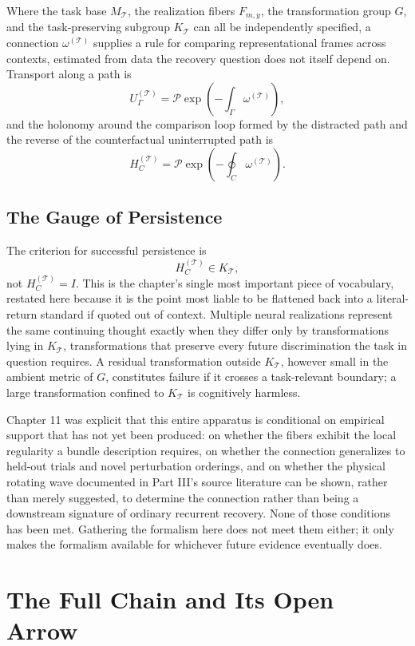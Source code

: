 \documentclass[11pt]{book}
\begin{document}
Where the task base $M_{\mathcal T}$, the realization fibers $F_{m,y}$, the transformation group $G$, and the task-preserving subgroup $K_{\mathcal T}$ can all be independently specified, a connection $\omega^{(\mathcal T)}$ supplies a rule for comparing representational frames across contexts, estimated from data the recovery question does not itself depend on. Transport along a path is
\[
U_\Gamma^{(\mathcal T)}=\mathcal P\exp\left(-\int_\Gamma\omega^{(\mathcal T)}\right),
\]
and the holonomy around the comparison loop formed by the distracted path and the reverse of the counterfactual uninterrupted path is
\[
H_C^{(\mathcal T)}=\mathcal P\exp\left(-\oint_C\omega^{(\mathcal T)}\right).
\]

\section*{The Gauge of Persistence}

The criterion for successful persistence is
\[
H_C^{(\mathcal T)}\in K_{\mathcal T},
\]
not $H_C^{(\mathcal T)}=I$. This is the chapter's single most important piece of vocabulary, restated here because it is the point most liable to be flattened back into a literal-return standard if quoted out of context. Multiple neural realizations represent the same continuing thought exactly when they differ only by transformations lying in $K_{\mathcal T}$, transformations that preserve every future discrimination the task in question requires. A residual transformation outside $K_{\mathcal T}$, however small in the ambient metric of $G$, constitutes failure if it crosses a task-relevant boundary; a large transformation confined to $K_{\mathcal T}$ is cognitively harmless.

Chapter 11 was explicit that this entire apparatus is conditional on empirical support that has not yet been produced: on whether the fibers exhibit the local regularity a bundle description requires, on whether the connection generalizes to held-out trials and novel perturbation orderings, and on whether the physical rotating wave documented in Part III's source literature can be shown, rather than merely suggested, to determine the connection rather than being a downstream signature of ordinary recurrent recovery. None of those conditions has been met. Gathering the formalism here does not meet them either; it only makes the formalism available for whichever future evidence eventually does.

\chapter{The Full Chain and Its Open Arrow}
\end{document}
